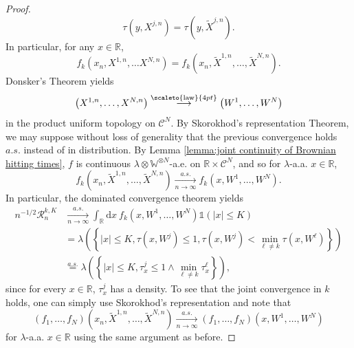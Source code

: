 \documentclass[12pt]{article}
\newcommand{\RR}{\mathbb R}
\newcommand{\R}{\mathcal R}
\newcommand{\1}{\mathds{1}}
\renewcommand{\d}{\mathrm d}
\newcommand{\distribution}{\stackrel{\scaleto{\mathrm{law}}{4pt}}{\longrightarrow}}
\numberwithin{equation}{section}
\begin{document}
\begin{proof}
    \begin{equation*}
        \tau\left(y,X^{j,n}\right)=\tau\left(y,\widetilde X^{j,n}\right).
    \end{equation*}
    In particular, for any $x\in\RR$,
    \begin{equation*}
        f_k\left(x_n,X^{1,n},\dots X^{N,n}\right)=f_k\left(x_n,\widetilde X^{1,n},\dots,\widetilde X^{N,n}\right).
    \end{equation*}
    Donsker's Theorem yields
    \begin{equation*}
        \left(X^{1,n},\dots,X^{N,n}\right)\distribution\left(W^1,\dots,W^N\right)
    \end{equation*}
    in the product uniform topology on $\mathcal C^N$. By Skorokhod's representation Theorem, we may suppose without loss of generality that the previous convergence holds $a.s.$ instead of in distribution. By Lemma \ref{lemma:joint continuity of Brownian hitting times}, $f$ is continuous $\lambda\otimes\mathbb W^{\otimes N}$-a.e. on $\RR\times\mathcal C^N$, and so for $\lambda$-a.a. $x\in\RR$,
    \begin{equation*}
        f_k\left(x_n,\widetilde X^{1,n},\dots,\widetilde X^{N,n}\right)\underset{n\rightarrow\infty}{\overset{a.s.}\longrightarrow}f_k\left(x,W^1,\dots,W^N\right).
    \end{equation*}
    In particular, the dominated convergence theorem yields 
    \begin{align*}
        n^{-1/2}\R_n^{k,K}&\underset{n\rightarrow\infty}{\overset{a.s.}\longrightarrow}\int_{\RR}\d x\ f_k\left(x,W^1,\dots,W^N\right)\1\left(|x|\le K\right)\\
        &=\lambda\left(\left\{|x|\le K, \tau\left(x, W^j\right)\le 1, \tau\left(x,W^j\right)<\min_{\ell\ne k}\tau\left(x,W^\ell\right)\right\}\right)\\
        &\overset{a.s.}=\lambda\left(\left\{|x|\le K, \tau_x^j\le 1\wedge\min_{\ell\ne k}\tau_x^\ell\right\}\right),
    \end{align*}
    since for every $x\in\RR$, $\tau_x^j$ has a density. To see that the joint convergence in $k$ holds, one can simply use Skorokhod's representation and note that 
    \begin{equation*}
        (f_1,\dots,f_N)\left(x_n,\widetilde X^{1,n},\dots,\widetilde X^{N,n}\right)\underset{n\rightarrow\infty}{\overset{a.s.}\longrightarrow}(f_1,\dots,f_N)\left(x,W^1,\dots,W^N\right)
    \end{equation*}
    for $\lambda$-a.a. $x\in\RR$ using the same argument as before.
\end{proof}
\end{document}
